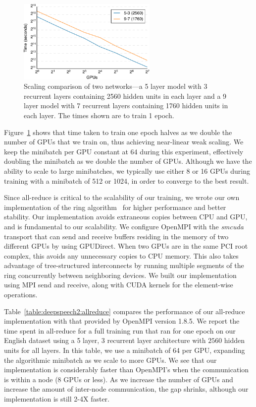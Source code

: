 \begin{figure}[h]
    \centering
    \includegraphics[width=0.6\textwidth]{deepspeech2/figures/weakscaling.pdf}
    \caption{Scaling comparison of two networks---a 5 layer model with 3
    recurrent layers containing 2560 hidden units in each layer and a 9 layer
    model with 7 recurrent layers containing 1760 hidden units in each layer.
    The times shown are to train 1 epoch.}
    \label{fig:deepspeech2:weakscaling}
\end{figure}

Figure~\ref{fig:deepspeech2:weakscaling} shows that time taken to train one
epoch halves as we double the number of GPUs that we train on, thus achieving
near-linear weak scaling. We keep the minibatch per GPU constant at 64 during
this experiment, effectively doubling the minibatch as we double the number of
GPUs. Although we have the ability to scale to large minibatches, we typically
use either 8 or 16 GPUs during training with a minibatch of 512 or 1024, in
order to converge to the best result.

Since all-reduce is critical to the scalability of our training, we wrote our
own implementation of the ring algorithm~\cite{patarasuk2009, thakur2005} for
higher performance and better stability. Our implementation avoids extraneous
copies between CPU and GPU, and is fundamental to our scalability. We configure
OpenMPI with the \emph{smcuda} transport that can send and receive buffers
residing in the memory of two different GPUs by using GPUDirect. When two GPUs
are in the same PCI root complex, this avoids any unnecessary copies to CPU
memory. This also takes advantage of tree-structured interconnects by running
multiple segments of the ring concurrently between neighboring devices. We
built our implementation using MPI send and receive, along with CUDA kernels
for the element-wise operations. 

Table~\ref{table:deepspeech2:allreduce} compares the performance of our all-reduce
implementation with that provided by OpenMPI version 1.8.5. We report the time
spent in all-reduce for a full training run that ran for one epoch on our
English dataset using a 5 layer, 3 recurrent layer architecture with $2560$
hidden units for all layers. In this table, we use a minibatch of 64 per GPU,
expanding the algorithmic minibatch as we scale to more GPUs. We see that our
implementation is considerably faster than OpenMPI's when the communication is
within a node (8 GPUs or less). As we increase the number of GPUs and increase
the amount of inter-node communication, the gap shrinks, although our
implementation is still 2-4X faster. 

